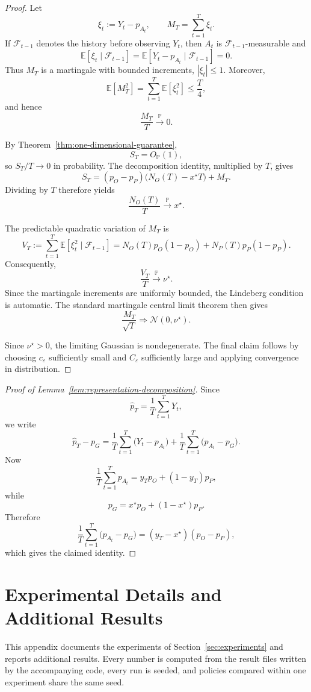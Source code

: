 \documentclass[twoside]{article}
\begin{document}
\begin{proof}
Let
\[
\xi_t:=Y_t-p_{A_t},
\qquad
M_T=\sum_{t=1}^T\xi_t.
\]
If \(\mathcal F_{t-1}\) denotes the history before observing \(Y_t\), then
\(A_t\) is \(\mathcal F_{t-1}\)-measurable and
\[
\mathbb E[\xi_t\mid\mathcal F_{t-1}]
=
\mathbb E[Y_t-p_{A_t}\mid\mathcal F_{t-1}]
=
0.
\]
Thus \(M_T\) is a martingale with bounded increments, \(|\xi_t|\leq1\).
Moreover,
\[
\mathbb E[M_T^2]
=
\sum_{t=1}^T\mathbb E[\xi_t^2]
\leq \frac{T}{4},
\]
and hence
\[
\frac{M_T}{T}
\xrightarrow{\mathbb P}0.
\]

By Theorem~\ref{thm:one-dimensional-guarantee},
\[
S_T=O_{\mathbb P}(1),
\]
so \(S_T/T\to0\) in probability. The decomposition identity, multiplied by
\(T\), gives
\[
S_T
=
(p_O-p_P)\bigl(N_O(T)-x^\star T\bigr)
+
M_T.
\]
Dividing by \(T\) therefore yields
\[
\frac{N_O(T)}{T}
\xrightarrow{\mathbb P}
x^\star.
\]

The predictable quadratic variation of \(M_T\) is
\[
V_T
:=
\sum_{t=1}^T
\mathbb E[\xi_t^2\mid\mathcal F_{t-1}]
=
N_O(T)p_O(1-p_O)
+
N_P(T)p_P(1-p_P).
\]
Consequently,
\[
\frac{V_T}{T}
\xrightarrow{\mathbb P}
\nu^\star.
\]
Since the martingale increments are uniformly bounded, the Lindeberg
condition is automatic. The standard martingale central limit theorem then
gives
\[
\frac{M_T}{\sqrt T}
\Longrightarrow
\mathcal N(0,\nu^\star).
\]

Since \(\nu^\star>0\), the limiting Gaussian is nondegenerate. The final
claim follows by choosing \(c_\varepsilon\) sufficiently small and
\(C_\varepsilon\) sufficiently large and applying convergence in
distribution.
\end{proof}
\begin{proof}[Proof of Lemma~\ref{lem:representation-decomposition}]
Since
\[
\widehat p_T
=
\frac1T\sum_{t=1}^T Y_t,
\]
we write
\[
\widehat p_T-p_G
=
\frac1T\sum_{t=1}^T
\bigl(Y_t-p_{A_t}\bigr)
+
\frac1T\sum_{t=1}^T
\bigl(p_{A_t}-p_G\bigr).
\]
Now
\[
\frac1T\sum_{t=1}^T p_{A_t}
=
y_Tp_O+(1-y_T)p_P,
\]
while
\[
p_G=x^\star p_O+(1-x^\star)p_P.
\]
Therefore
\[
\frac1T\sum_{t=1}^T
\bigl(p_{A_t}-p_G\bigr)
=
(y_T-x^\star)(p_O-p_P),
\]
which gives the claimed identity.
\end{proof}

\section{Experimental Details and Additional Results}
\label{app:experiments}

This appendix documents the experiments of Section~\ref{sec:experiments}
and reports additional results. Every number is computed from the result
files written by the accompanying code, every run is seeded, and policies
compared within one experiment share the same seed.
\end{document}
